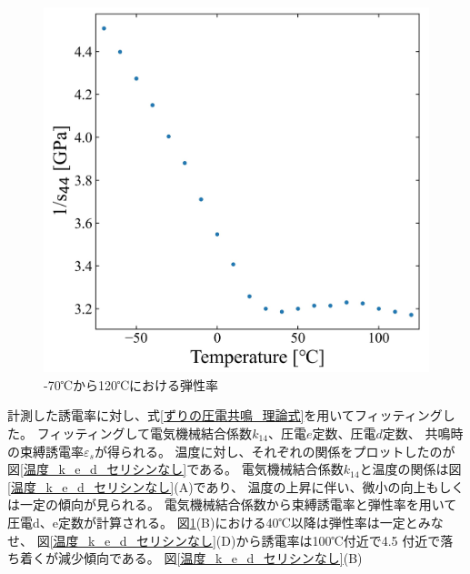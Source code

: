 \documentclass[dvipdfmx,12pt,a4paper]{jreport}
\begin{document}
			\begin{figure}[H]
				\centering
				\includegraphics[scale=1]{温度_弾性率_セリシンなし.jpg}
				\caption{-70℃から120℃における弾性率}
				\label{温度_弾性率_セリシンなし}
			\end{figure}
		\newpage
		計測した誘電率に対し、式\ref{ずりの圧電共鳴_理論式}を用いてフィッティングした。
		フィッティングして電気機械結合係数$k_{14}$、圧電$e$定数、圧電$d$定数、
		共鳴時の束縛誘電率$\varepsilon_s$が得られる。
		温度に対し、それぞれの関係をプロットしたのが図\ref{温度_k_e_d_セリシンなし}である。
		電気機械結合係数$k_{14}$と温度の関係は図\ref{温度_k_e_d_セリシンなし}(A)であり、
		温度の上昇に伴い、微小の向上もしくは一定の傾向が見られる。
		電気機械結合係数から束縛誘電率と弾性率を用いて圧電d、e定数が計算される。
		図\ref{温度_弾性率_セリシンなし}(B)における40℃以降は弾性率は一定とみなせ、
		図\ref{温度_k_e_d_セリシンなし}(D)から誘電率は100℃付近で4.5 付近で落ち着くが減少傾向である。
		図\ref{温度_k_e_d_セリシンなし}(B)
\end{document}
